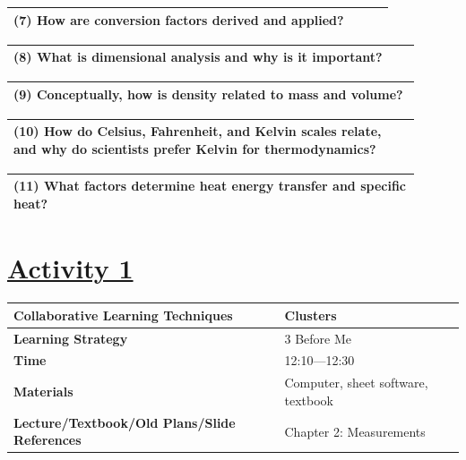 \documentclass{article}
\begin{document}
\begin{tabular}{|p{0.9\linewidth}|}
\hline
\textbf{(7) How are conversion factors derived and applied?} \\ \hline
\end{tabular}
\newpage

\begin{tabular}{|p{0.9\linewidth}|}
\hline
\textbf{(8) What is dimensional analysis and why is it important?} \\ \hline
\end{tabular}
\newpage

\begin{tabular}{|p{0.9\linewidth}|}
\hline
\textbf{(9) Conceptually, how is density related to mass and volume?} \\ \hline
\end{tabular}
\newpage

\begin{tabular}{|p{0.9\linewidth}|}
\hline
\textbf{(10) How do Celsius, Fahrenheit, and Kelvin scales relate, and why do scientists prefer Kelvin for thermodynamics?} \\ \hline
\end{tabular}
\newpage

\begin{tabular}{|p{0.9\linewidth}|}
\hline
\textbf{(11) What factors determine heat energy transfer and specific heat?} \\ \hline
\end{tabular}
\newpage

\section*{\underline{Activity 1}}
\begin{tabular}{|p{4.2cm}|p{9.8cm}|}
\hline
\textbf{Collaborative Learning Techniques} & Clusters \\
\hline
\textbf{Learning Strategy} & 3 Before Me \\
\hline
\textbf{Time} & 12:10---12:30 \\
\hline
\textbf{Materials} & Computer, sheet software, textbook \\
\hline
\textbf{Lecture/Textbook/Old Plans/Slide References} & Chapter 2: Measurements \\
\hline
\end{tabular}

\vspace{0.5cm}
\end{document}
